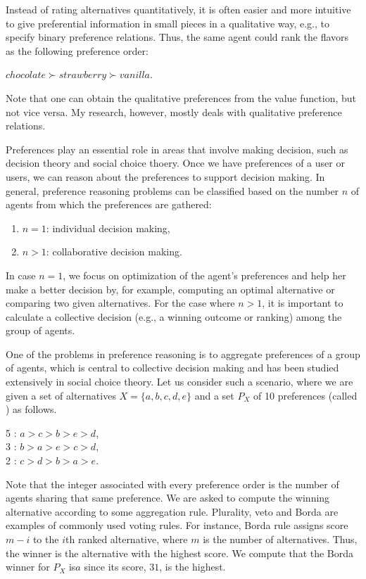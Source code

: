Instead of rating alternatives quantitatively, it is
often easier and more intuitive to give preferential information
in small pieces in a qualitative way,
e.g., to specify binary preference relations.
Thus, the same agent could rank the flavors as the following
preference order:
\begin{center}
	$chocolate \succ strawberry \succ vanilla$.
\end{center}
Note that one can obtain the qualitative preferences from
the value function, but not vice versa.
My research, however, mostly deals with qualitative preference relations.

Preferences play an essential role in areas that involve making
decision, such as decision theory and social choice thoery.
Once we have preferences of a user or users, we can reason about
the preferences to support decision making.
In general, preference reasoning problems can be classified
based on the number $n$ of agents from which the preferences are gathered:
\begin{enumerate} \itemsep -4pt
	\item $n=1$: individual decision making,
	\item $n>1$: collaborative decision making.
\end{enumerate}
In case $n=1$, we focus on optimization of the agent's preferences and
help her make a better decision by, for example, computing an optimal
alternative or comparing two given alternatives.  For the case
where $n>1$, it is important to calculate
a collective decision (e.g., a winning outcome or ranking)
among the group of agents.

One of the problems in preference reasoning is to
aggregate preferences of a group of
agents, which is central to collective decision making and has been studied
extensively in social choice theory. 
Let us consider such a scenario, where we are
given a set of alternatives $X = \{ a,b,c,d,e \}$ and a set $P_X$ of 10 
preferences (called ) as follows.
	\begin{center}
		5 : $a > c > b > e > d$,\\
		3 : $b > a > e > c > d$,\\
		2 : $c > d > b > a > e$.
	\end{center}
	
Note that the integer associated with every preference order
is the number of agents sharing that same preference.
We are asked to compute the winning alternative according to some aggregation rule. 
Plurality, veto and Borda are examples of commonly used voting rules.
For instance, Borda rule assigns score $m-i$ to the $i$th ranked 
alternative, where $m$ is the number of alternatives.
Thus, the winner is the alternative with the highest score.
We compute that the Borda winner for $P_X$ is$a$ since its 
score, $31$, is the highest.

